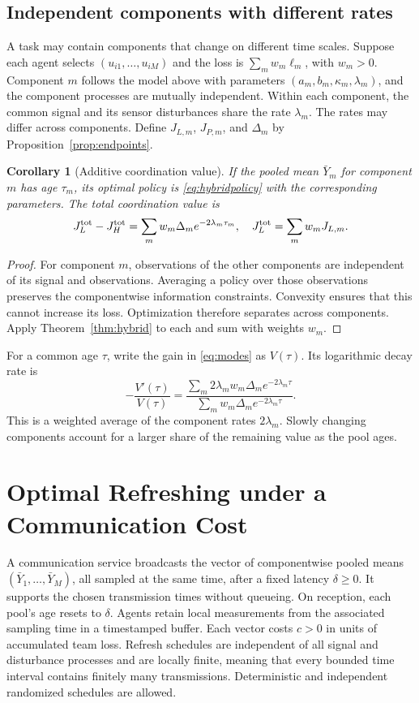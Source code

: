 \documentclass[letterpaper,10pt,conference]{ieeeconf}
\newtheorem{corollary}{Corollary}
\begin{document}
\subsection{Independent components with different rates}
A task may contain components that change on different time scales. Suppose each agent selects $(u_{i1},\ldots,u_{iM})$ and the loss is $\sum_m w_m\ell_m$, with $w_m>0$. Component $m$ follows the model above with parameters $(a_m,b_m,\kappa_m,\lambda_m)$, and the component processes are mutually independent. Within each component, the common signal and its sensor disturbances share the rate $\lambda_m$. The rates may differ across components. Define $J_{L,m}$, $J_{P,m}$, and $\Delta_m$ by Proposition~\ref{prop:endpoints}.
\begin{corollary}[Additive coordination value]\label{cor:modes}
If the pooled mean $\bar Y_m$ for component $m$ has age $\tau_m$, its optimal policy is \eqref{eq:hybridpolicy} with the corresponding parameters. The total coordination value is
\begin{equation}
 J_L^{\rm tot}-J_H^{\rm tot}=\sum_m w_m\Delta_m e^{-2\lambda_m\tau_m},
 \quad J_L^{\rm tot}=\sum_m w_mJ_{L,m}.\label{eq:modes}
\end{equation}
\end{corollary}
\begin{proof}
For component $m$, observations of the other components are independent of its signal and observations. Averaging a policy over those observations preserves the componentwise information constraints. Convexity ensures that this cannot increase its loss. Optimization therefore separates across components. Apply Theorem~\ref{thm:hybrid} to each and sum with weights $w_m$.
\end{proof}
For a common age $\tau$, write the gain in \eqref{eq:modes} as $V(\tau)$. Its logarithmic decay rate is
\begin{equation}
 -\frac{V'(\tau)}{V(\tau)}=
 \frac{\sum_m2\lambda_m w_m\Delta_m e^{-2\lambda_m\tau}}
 {\sum_m w_m\Delta_m e^{-2\lambda_m\tau}}.\label{eq:effective}
\end{equation}
This is a weighted average of the component rates $2\lambda_m$. Slowly changing components account for a larger share of the remaining value as the pool ages.

\section{Optimal Refreshing under a Communication Cost}
A communication service broadcasts the vector of componentwise pooled means $(\bar Y_1,\ldots,\bar Y_M)$, all sampled at the same time, after a fixed latency $\delta\ge0$. It supports the chosen transmission times without queueing. On reception, each pool's age resets to $\delta$. Agents retain local measurements from the associated sampling time in a timestamped buffer. Each vector costs $c>0$ in units of accumulated team loss. Refresh schedules are independent of all signal and disturbance processes and are locally finite, meaning that every bounded time interval contains finitely many transmissions. Deterministic and independent randomized schedules are allowed.
\end{document}

